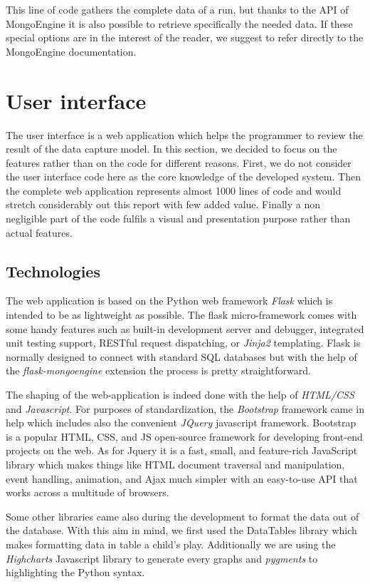 This line of code gathers the complete data of a run, but thanks to the API of MongoEngine it is also possible to retrieve specifically the needed data. If these special options are in the interest of the reader, we suggest to refer directly to the MongoEngine documentation.

\section{User interface}
The user interface is a web application which helps the programmer to review the result of the data capture model. In this section,  we decided to focus on the features rather than on the code for different reasons. First, we do not consider the user interface code here as the core knowledge of the developed system. Then the complete web application represents almost 1000 lines of code and would stretch considerably out this report with few added value. Finally a non negligible part of the code fulfils a visual and presentation purpose rather than actual features.

\subsection{Technologies}
The web application is based on the Python web framework \textit{Flask} which is intended to be as lightweight as possible. The flask micro-framework comes with some handy features such as built-in development server and debugger, integrated unit testing support, RESTful request dispatching, or \textit{Jinja2} templating. Flask is normally designed to connect with standard SQL databases but with the help of the \textit{flask-mongoengine} extension the process is pretty straightforward.

The shaping of the web-application is indeed done with the help of \textit{HTML/CSS} and \textit{Javascript}. For purposes of standardization, the \textit{Bootstrap} framework came in help which includes also the convenient \textit{JQuery} javascript framework. Bootstrap is a popular HTML, CSS, and JS open-source framework for developing front-end projects on the web. As for Jquery it is a fast, small, and feature-rich JavaScript library which makes things like HTML document traversal and manipulation, event handling, animation, and Ajax much simpler with an easy-to-use API that works across a multitude of browsers.

Some other libraries came also during the development to format the data out of the database. With this aim in mind, we first used the DataTables library which makes formatting data in table a child's play. Additionally we are using the \textit{Highcharts} Javascript library to generate every graphs and \textit{pygments} to highlighting the Python syntax.

